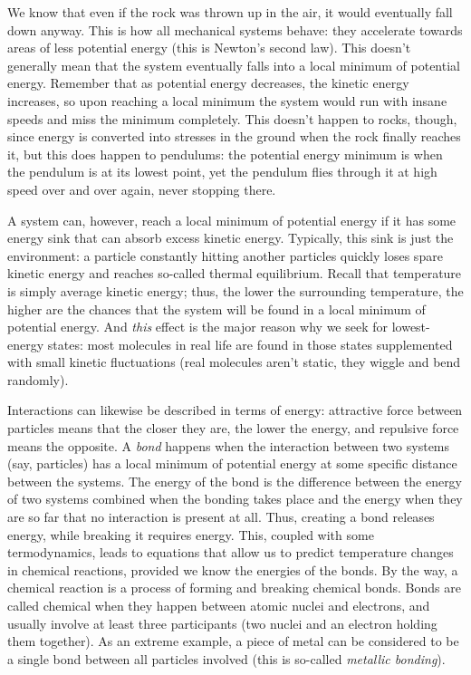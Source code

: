 \documentclass{article}
\begin{document}
We know that even if the rock was thrown up in the air, it would eventually fall down anyway. This is how all mechanical systems behave: they accelerate towards areas of less potential energy (this is Newton's second law). This doesn't generally mean that the system eventually falls into a local minimum of potential energy. Remember that as potential energy decreases, the kinetic energy increases, so upon reaching a local minimum the system would run with insane speeds and miss the minimum completely. This doesn't happen to rocks, though, since energy is converted into stresses in the ground when the rock finally reaches it, but this does happen to pendulums: the potential energy minimum is when the pendulum is at its lowest point, yet the pendulum flies through it at high speed over and over again, never stopping there.

A system can, however, reach a local minimum of potential energy if it has some energy sink that can absorb excess kinetic energy. Typically, this sink is just the environment: a particle constantly hitting another particles quickly loses spare kinetic energy and reaches so-called thermal equilibrium. Recall that temperature is simply average kinetic energy; thus, the lower the surrounding temperature, the higher are the chances that the system will be found in a local minimum of potential energy. And \textit{this} effect is the major reason why we seek for lowest-energy states: most molecules in real life are found in those states supplemented with small kinetic fluctuations (real molecules aren't static, they wiggle and bend randomly).

Interactions can likewise be described in terms of energy: attractive force between particles means that the closer they are, the lower the energy, and repulsive force means the opposite. A \textit{bond} happens when the interaction between two systems (say, particles) has a local minimum of potential energy at some specific distance between the systems. The energy of the bond is the difference between the energy of two systems combined when the bonding takes place and the energy when they are so far that no interaction is present at all. Thus, creating a bond releases energy, while breaking it requires energy. This, coupled with some termodynamics, leads to equations that allow us to predict temperature changes in chemical reactions, provided we know the energies of the bonds. By the way, a chemical reaction is a process of forming and breaking chemical bonds. Bonds are called chemical when they happen between atomic nuclei and electrons, and usually involve at least three participants (two nuclei and an electron holding them together). As an extreme example, a piece of metal can be considered to be a single bond between all particles involved (this is so-called \textit{metallic bonding}).
\end{document}
